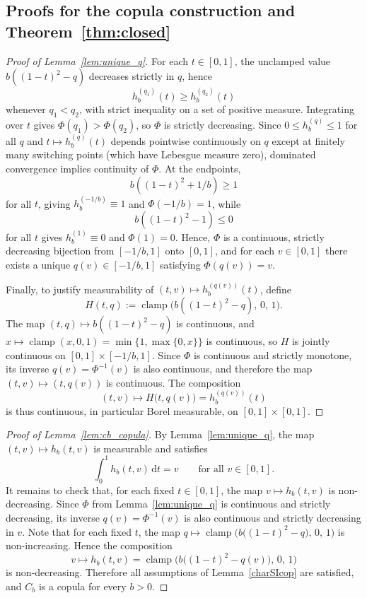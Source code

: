 \documentclass{article}
\DeclareMathOperator{\clamp}{clamp}
\newcommand{\1}{\mathds{1}}
\newcommand{\de}{\mathrm{\,d}}
\begin{document}
\subsection{Proofs for the copula construction and Theorem~\ref{thm:closed}}
\label{sec:proofs_novel_copula}

\begin{proof}[Proof of Lemma~\ref{lem:unique_q}]
For each $t\in[0,1]$, the unclamped value $b((1-t)^2-q)$ decreases strictly in $q$, hence
\[
h_b^{(q_1)}(t)\ge h_b^{(q_2)}(t)
\]
whenever $q_1<q_2$, with strict inequality on a set of positive measure.
Integrating over $t$ gives $\Phi(q_1)>\Phi(q_2)$, so $\Phi$ is strictly decreasing.
Since $0\le h_b^{(q)}\le1$ for all $q$ and $t\mapsto h_b^{(q)}(t)$ depends pointwise continuously on $q$ except at finitely many switching points (which have Lebesgue measure zero), dominated convergence implies continuity of $\Phi$.
At the endpoints,
\[
b((1-t)^2+1/b)\ge1
\]
for all $t$, giving $h_b^{(-1/b)}\equiv1$ and $\Phi(-1/b)=1$,
while
\[
b((1-t)^2-1)\le0
\]
for all $t$ gives $h_b^{(1)}\equiv0$ and $\Phi(1)=0$.
Hence, $\Phi$ is a continuous, strictly decreasing bijection from $[-1/b,1]$ onto $[0,1]$, and for each $v\in[0,1]$ there exists a unique $q(v)\in[-1/b,1]$ satisfying $\Phi(q(v))=v$.

Finally, to justify measurability of $(t,v)\mapsto h_b^{(q(v))}(t)$, define
\[
H(t,q):=\clamp\!\big(b((1-t)^2-q),\,0,\,1\big).
\]
The map $(t,q)\mapsto b((1-t)^2-q)$ is continuous, and $x\mapsto \clamp(x,0,1)=\min\{1,\max\{0,x\}\}$ is continuous, so $H$ is jointly continuous on $[0,1]\times[-1/b,1]$.
Since $\Phi$ is continuous and strictly monotone, its inverse $q(v)=\Phi^{-1}(v)$ is also continuous, and therefore the map $(t,v)\mapsto (t,q(v))$ is continuous.
The composition
\[
(t,v)\mapsto H\bigl(t,q(v)\bigr)=h_b^{(q(v))}(t)
\]
is thus continuous, in particular Borel measurable, on $[0,1]\times[0,1]$.
\end{proof}

\begin{proof}[Proof of Lemma~\ref{lem:cb_copula}]
By Lemma~\ref{lem:unique_q}, the map $(t,v)\mapsto h_b(t,v)$ is measurable and satisfies
\[
\int_0^1 h_b(t,v)\de t=v
\qquad\text{for all }v\in[0,1].
\]
It remains to check that, for each fixed $t\in[0,1]$, the map $v\mapsto h_b(t,v)$ is non-decreasing. Since $\Phi$ from Lemma~\ref{lem:unique_q} is continuous and strictly decreasing, its inverse $q(v)=\Phi^{-1}(v)$ is also continuous and strictly decreasing in $v$.
Note that for each fixed $t$, the map
\(
q\mapsto \clamp\!\Big(b\big((1-t)^2-q\big),\,0,\,1\Big)
\)
is non-increasing. Hence the composition
\[
v\longmapsto h_b(t,v)
=\clamp\!\Big(b\big((1-t)^2-q(v)\big),\,0,\,1\Big)
\]
is non-decreasing. Therefore all assumptions of Lemma~\ref{charSIcop} are satisfied, and $C_b$ is a copula for every $b>0$.
\end{proof}
\end{document}
